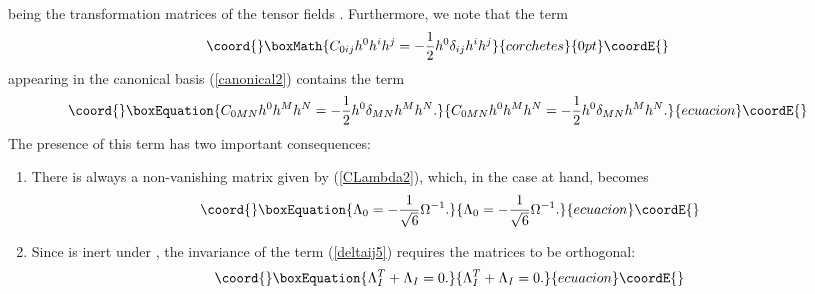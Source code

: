 \documentclass[a4paper,11pt]{article}
\begin{document}
being the \coordHE{} transformation matrices of the tensor fields
\coordHE{}.
Furthermore, we note that the term
\begin{displaymath}\coord{}\boxMath{
C_{0ij}h^{0}h^{i}h^{j}=-\frac{1}{2} h^{0}\delta_{ij}h^{i}h^{j}
}{corchetes}{0pt}\coordE{}\end{displaymath}
appearing in the canonical basis (\ref{canonical2}) contains the
term
\begin{equation}\coord{}\boxEquation{\label{deltaij5}
C_{0MN}h^{0}h^{M}h^{N}=-\frac{1}{2}h^{0}\delta_{MN}h^{M}h^{N}.
}{C_{0MN}h^{0}h^{M}h^{N}=-\frac{1}{2}h^{0}\delta_{MN}h^{M}h^{N}.
}{ecuacion}\coordE{}\end{equation}
The presence of this term has two important consequences:
\begin{enumerate}
\item There is always a non-vanishing matrix \coordHE{} given
by (\ref{CLambda2}), which, in the case at hand, becomes
\begin{equation}\coord{}\boxEquation{\label{LisOmega}
\Lambda_{0}=-\frac{1}{\sqrt{6}}\Omega^{-1}.
}{\Lambda_{0}=-\frac{1}{\sqrt{6}}\Omega^{-1}.
}{ecuacion}\coordE{}\end{equation}

\item Since \coordHE{} is inert under \coordHE{}, the \coordHE{} invariance of the term
(\ref{deltaij5}) requires the matrices \coordHE{} to be
orthogonal:
\begin{equation}\coord{}\boxEquation{\label{Lisorthogonal}
\Lambda_{I}^{T}+\Lambda_{I}=0.
}{\Lambda_{I}^{T}+\Lambda_{I}=0.
}{ecuacion}\coordE{}\end{equation}
\end{enumerate}
\end{document}
